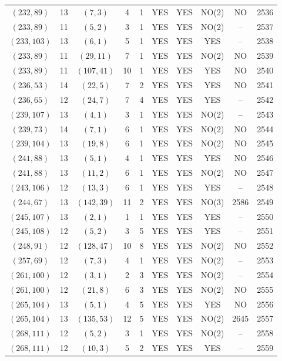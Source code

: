 \begin{longtable}{|c|c|c|c|c|c|c|c|c|c|}
$(232, 89)$ & 13 & $(7, 3)$ & 4 & 1 & YES & YES & NO(2) & NO & 2536\\
$(233, 89)$ & 11 & $(5, 2)$ & 3 & 1 & YES & YES & NO(2) & -- & 2537\\
$(233, 103)$ & 13 & $(6, 1)$ & 5 & 1 & YES & YES & YES & -- & 2538\\
$(233, 89)$ & 11 & $(29, 11)$ & 7 & 1 & YES & YES & NO(2) & NO & 2539\\
$(233, 89)$ & 11 & $(107, 41)$ & 10 & 1 & YES & YES & YES & NO & 2540\\
$(236, 53)$ & 14 & $(22, 5)$ & 7 & 2 & YES & YES & YES & NO & 2541\\
$(236, 65)$ & 12 & $(24, 7)$ & 7 & 4 & YES & YES & YES & -- & 2542\\
$(239, 107)$ & 13 & $(4, 1)$ & 3 & 1 & YES & YES & NO(2) & -- & 2543\\
$(239, 73)$ & 14 & $(7, 1)$ & 6 & 1 & YES & YES & NO(2) & NO & 2544\\
$(239, 104)$ & 13 & $(19, 8)$ & 6 & 1 & YES & YES & NO(2) & NO & 2545\\
$(241, 88)$ & 13 & $(5, 1)$ & 4 & 1 & YES & YES & YES & NO & 2546\\
$(241, 88)$ & 13 & $(11, 2)$ & 6 & 1 & YES & YES & NO(2) & NO & 2547\\
$(243, 106)$ & 12 & $(13, 3)$ & 6 & 1 & YES & YES & YES & -- & 2548\\
$(244, 67)$ & 13 & $(142, 39)$ & 11 & 2 & YES & YES & NO(3) & 2586 & 2549\\
$(245, 107)$ & 13 & $(2, 1)$ & 1 & 1 & YES & YES & YES & -- & 2550\\
$(245, 108)$ & 12 & $(5, 2)$ & 3 & 5 & YES & YES & YES & -- & 2551\\
$(248, 91)$ & 12 & $(128, 47)$ & 10 & 8 & YES & YES & NO(2) & NO & 2552\\
$(257, 69)$ & 12 & $(7, 3)$ & 4 & 1 & YES & YES & NO(2) & -- & 2553\\
$(261, 100)$ & 12 & $(3, 1)$ & 2 & 3 & YES & YES & NO(2) & -- & 2554\\
$(261, 100)$ & 12 & $(21, 8)$ & 6 & 3 & YES & YES & NO(2) & NO & 2555\\
$(265, 104)$ & 13 & $(5, 1)$ & 4 & 5 & YES & YES & YES & NO & 2556\\
$(265, 104)$ & 13 & $(135, 53)$ & 12 & 5 & YES & YES & NO(2) & 2645 & 2557\\
$(268, 111)$ & 12 & $(5, 2)$ & 3 & 1 & YES & YES & NO(2) & -- & 2558\\
$(268, 111)$ & 12 & $(10, 3)$ & 5 & 2 & YES & YES & YES & -- & 2559\\

\end{longtable}
